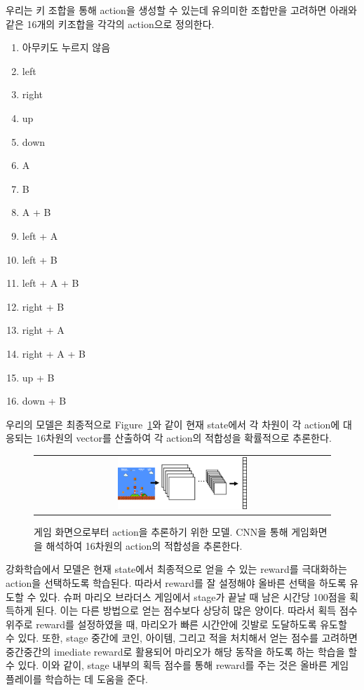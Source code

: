우리는 키 조합을 통해 action을 생성할 수 있는데 유의미한 조합만을 고려하면 아래와 같은 16개의 키조합을 각각의 action으로 정의한다.
\begin{enumerate}
	\item 아무키도 누르지 않음
	\item left
	\item right
	\item up
	\item down
	\item A
	\item B
	\item A + B
	\item left + A
	\item left + B
	\item left + A + B
	\item right + B
	\item right + A
	\item right + A + B
	\item up + B
	\item down + B
\end{enumerate}
우리의 모델은 최종적으로 Figure~\ref{fig:overview}와 같이 현재 state에서 각 차원이 각 action에 대응되는 16차원의 vector를 산출하여 각 action의 적합성을 확률적으로 추론한다.
\begin{figure}[]
\begin{center}
\begin{tabular}{c}
     \includegraphics[width=0.45\textwidth]{FIG/overview.pdf} \\
\end{tabular}
\caption{
	게임 화면으로부터 action을 추론하기 위한 모델. CNN을 통해 게임화면을 해석하여 16차원의 action의 적합성을 추론한다.
}
\label{fig:overview}
\end{center}
\end{figure}

강화학습에서 모델은 현재 state에서 최종적으로 얻을 수 있는 reward를 극대화하는 action을 선택하도록 학습된다.
따라서 reward를 잘 설정해야 올바른 선택을 하도록 유도할 수 있다.
슈퍼 마리오 브라더스 게임에서 stage가 끝날 때 남은 시간당 100점을 획득하게 된다.
이는 다른 방법으로 얻는 점수보다 상당히 많은 양이다.
따라서 획득 점수 위주로 reward를 설정하였을 때, 마리오가 빠른 시간안에 깃발로 도달하도록 유도할 수 있다.
또한, stage 중간에 코인, 아이템, 그리고 적을 처치해서 얻는 점수를 고려하면 중간중간의 imediate reward로 활용되어 마리오가 해당 동작을 하도록 하는 학습을 할 수 있다.
이와 같이, stage 내부의 획득 점수를 통해 reward를 주는 것은 올바른 게임 플레이를 학습하는 데 도움을 준다.

